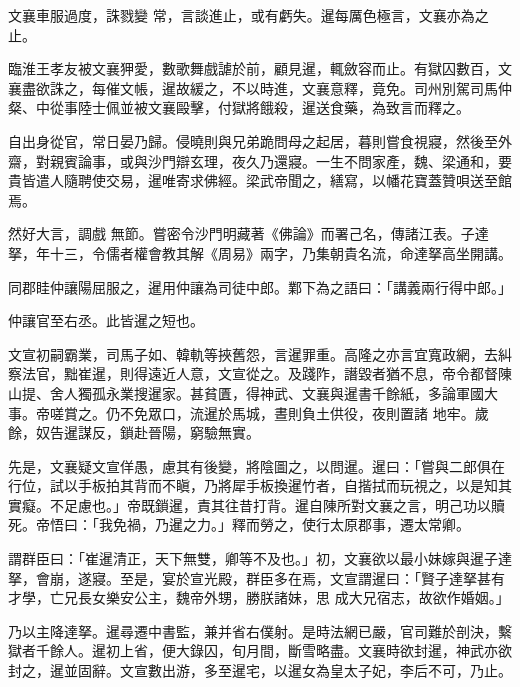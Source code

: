 \begin{pinyinscope}
 文襄車服過度，誅戮變
 常，言談進止，或有虧失。暹每厲色極言，文襄亦為之止。



 臨淮王孝友被文襄狎愛，數歌舞戲謔於前，顧見暹，輒斂容而止。有獄囚數百，文襄盡欲誅之，每催文帳，暹故緩之，不以時進，文襄意釋，竟免。司州別駕司馬仲粲、中從事陸士佩並被文襄毆擊，付獄將餓殺，暹送食藥，為致言而釋之。



 自出身從官，常日晏乃歸。侵曉則與兄弟跪問母之起居，暮則嘗食視寢，然後至外齋，對親賓論事，或與沙門辯玄理，夜久乃還寢。一生不問家產，魏、梁通和，要貴皆遣人隨聘使交易，暹唯寄求佛經。梁武帝聞之，繕寫，以幡花寶蓋贊唄送至館焉。



 然好大言，調戲
 無節。嘗密令沙門明藏著《佛論》而署己名，傳諸江表。子達拏，年十三，令儒者權會教其解《周易》兩字，乃集朝貴名流，命達拏高坐開講。



 同郡眭仲讓陽屈服之，暹用仲讓為司徒中郎。鄴下為之語曰：「講義兩行得中郎。」



 仲讓官至右丞。此皆暹之短也。



 文宣初嗣霸業，司馬子如、韓軌等挾舊怨，言暹罪重。高隆之亦言宜寬政網，去糾察法官，黜崔暹，則得遠近人意，文宣從之。及踐阼，譖毀者猶不息，帝令都督陳山提、舍人獨孤永業搜暹家。甚貧匱，得神武、文襄與暹書千餘紙，多論軍國大事。帝嗟賞之。仍不免眾口，流暹於馬城，晝則負土供役，夜則置諸
 地牢。歲餘，奴告暹謀反，鎖赴晉陽，窮驗無實。



 先是，文襄疑文宣佯愚，慮其有後變，將陰圖之，以問暹。暹曰：「嘗與二郎俱在行位，試以手板拍其背而不瞋，乃將犀手板換暹竹者，自揩拭而玩視之，以是知其實癡。不足慮也。」帝既鎖暹，責其往昔打背。暹自陳所對文襄之言，明己功以贖死。帝悟曰：「我免禍，乃暹之力。」釋而勞之，使行太原郡事，遷太常卿。



 謂群臣曰：「崔暹清正，天下無雙，卿等不及也。」初，文襄欲以最小妹嫁與暹子達拏，會崩，遂寢。至是，宴於宣光殿，群臣多在焉，文宣謂暹曰：「賢子達拏甚有才學，亡兄長女樂安公主，魏帝外甥，勝朕諸妹，思
 成大兄宿志，故欲作婚姻。」



 乃以主降達拏。暹尋遷中書監，兼并省右僕射。是時法網已嚴，官司難於剖決，繫獄者千餘人。暹初上省，便大錄囚，旬月間，斷雪略盡。文襄時欲封暹，神武亦欲封之，暹並固辭。文宣數出游，多至暹宅，以暹女為皇太子妃，李后不可，乃止。




\end{pinyinscope}
